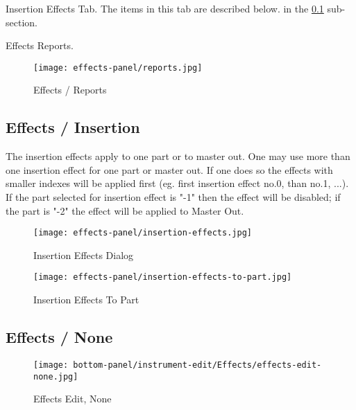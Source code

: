    Insertion Effects Tab.
   The items in this tab are described below.
   in the \ref{subsec:effects_insertion}
   sub-section.

   Effects Reports.

\begin{figure}[H]
   \centering 
   \texttt{[image: effects-panel/reports.jpg]}
   \caption{Effects / Reports}
   \label{fig:effects_reports}
\end{figure}

\subsection{Effects / Insertion}
\label{subsec:effects_insertion}

   The insertion effects apply to one part or to master out. One may use more
   than one insertion effect for one part or master out. If one does so the
   effects with smaller indexes will be applied first (eg. first insertion
   effect no.0, than no.1, ...). If the part selected for insertion
   effect is "-1" then the effect will be disabled; if the part is "-2" the
   effect will be applied to Master Out. 

\begin{figure}[H]
   \centering 
   \texttt{[image: effects-panel/insertion-effects.jpg]}
   \caption{Insertion Effects Dialog}
   \label{fig:insertion_effects_dialog}
\end{figure}

\begin{figure}[H]
   \centering 
   \texttt{[image: effects-panel/insertion-effects-to-part.jpg]}
   \caption{Insertion Effects To Part}
   \label{fig:insertion_effects_to_part}
\end{figure}

\subsection{Effects / None}
\label{subsec:effects_edit_none}

\begin{figure}[H]
   \centering 
   \texttt{[image: bottom-panel/instrument-edit/Effects/effects-edit-none.jpg]}
   \caption{Effects Edit, None}
   \label{fig:effects_edit_none}
\end{figure}


